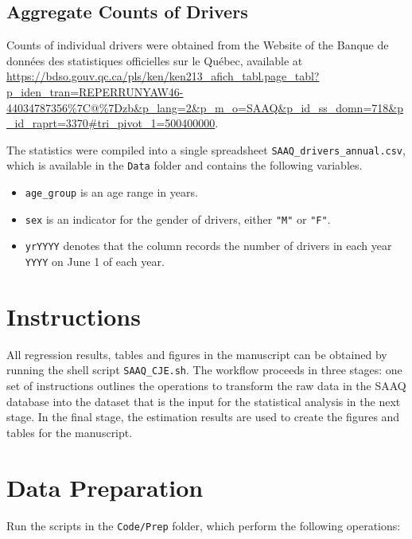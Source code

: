\documentclass[11pt]{paper}
\begin{document}
\subsection*{Aggregate Counts of Drivers}


Counts of individual drivers were obtained 
from the Website of the 
Banque de donn\'{e}es des statistiques officielles sur le Qu\'{e}bec, 
available at
\url{https://bdso.gouv.qc.ca/pls/ken/ken213_afich_tabl.page_tabl?p_iden_tran=REPERRUNYAW46-44034787356%7C@%7Dzb&p_lang=2&p_m_o=SAAQ&p_id_ss_domn=718&p_id_raprt=3370#tri_pivot_1=500400000}. 


The statistics were compiled into a single spreadsheet
\texttt{SAAQ\_drivers\_annual.csv}, 
which is available in the \texttt{Data} folder
and contains the following variables. 


\begin{itemize}

\item \texttt{age\_group} is an age range in years.
\item \texttt{sex} is an indicator for the gender of drivers, 
  either \texttt{"M"} or \texttt{"F"}.
\item \texttt{yrYYYY} denotes that the column records the number of drivers in each year \texttt{YYYY} on June 1 of each year.

\end{itemize}


\section*{Instructions}

All regression results, tables and figures in the manuscript
can be obtained by running the shell script \texttt{SAAQ\_CJE.sh}. 
The workflow proceeds in three stages: 
one set of instructions outlines the operations 
to transform the raw data in the 
SAAQ database into the dataset that is the input 
for the statistical analysis
in the next stage. 
In the final stage, the estimation results 
are used to create the figures and tables for the manuscript. 


\section*{Data Preparation}

Run the scripts in the \texttt{Code/Prep} folder, which 
perform the following operations:
\end{document}
